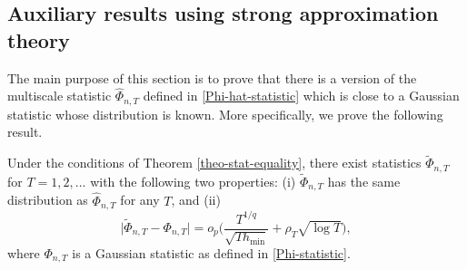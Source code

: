\documentclass[a4paper,12pt]{article}
\begin{document}
\subsection*{Auxiliary results using strong approximation theory}


The main purpose of this section is to prove that there is a version of the multiscale statistic $\widehat{\Phi}_{n,T}$ defined in \eqref{Phi-hat-statistic} which is close to a Gaussian statistic whose distribution is known. More specifically, we prove the following result. 
\begin{propA}\label{propA-strong-approx-equality}
Under the conditions of Theorem \ref{theo-stat-equality}, there exist statistics $\widetilde{\Phi}_{n,T}$ for $T = 1,2,\ldots$ with the following two properties: (i) $\widetilde{\Phi}_{n, T}$ has the same distribution as $\widehat{\Phi}_{n, T}$ for any $T$, and (ii)
\[ \big| \widetilde{\Phi}_{n, T} - \Phi_{n,T} \big| = o_p \Big( \frac{T^{1/q}}{\sqrt{T h_{\min}}} + \rho_T \sqrt{\log T} \Big), \]
where $\Phi_{n,T}$ is a Gaussian statistic as defined in \eqref{Phi-statistic}. 
\end{propA}
\end{document}
